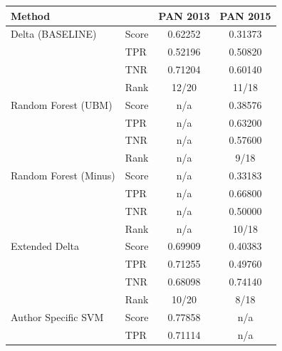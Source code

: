 \begin{table}
    \centering
    \begin{tabular}{ll|cc}
        \textbf{Method}           &           & \textbf{PAN 2013} & \textbf{PAN 2015} \\ \hline
        Delta (BASELINE)          & Score     & 0.62252           & 0.31373           \\
                                  & \gls{TPR} & 0.52196           & 0.50820           \\
                                  & \gls{TNR} & 0.71204           & 0.60140           \\
                                  & Rank      & 12/20             & 11/18             \\ \hline
        Random Forest (\gls{UBM}) & Score     & n/a               & 0.38576           \\
                                  & \gls{TPR} & n/a               & 0.63200           \\
                                  & \gls{TNR} & n/a               & 0.57600           \\
                                  & Rank      & n/a               & 9/18              \\ \hline
        Random Forest (Minus)     & Score     & n/a               & 0.33183           \\
                                  & \gls{TPR} & n/a               & 0.66800           \\
                                  & \gls{TNR} & n/a               & 0.50000           \\
                                  & Rank      & n/a               & 10/18             \\ \hline
        Extended Delta            & Score     & 0.69909           & 0.40383           \\
                                  & \gls{TPR} & 0.71255           & 0.49760           \\
                                  & \gls{TNR} & 0.68098           & 0.74140           \\
                                  & Rank      & 10/20             & 8/18              \\ \hline
        Author Specific SVM       & Score     & 0.77858           & n/a               \\
                                  & \gls{TPR} & 0.71114           & n/a               \\

\end{tabular}
\end{table}
